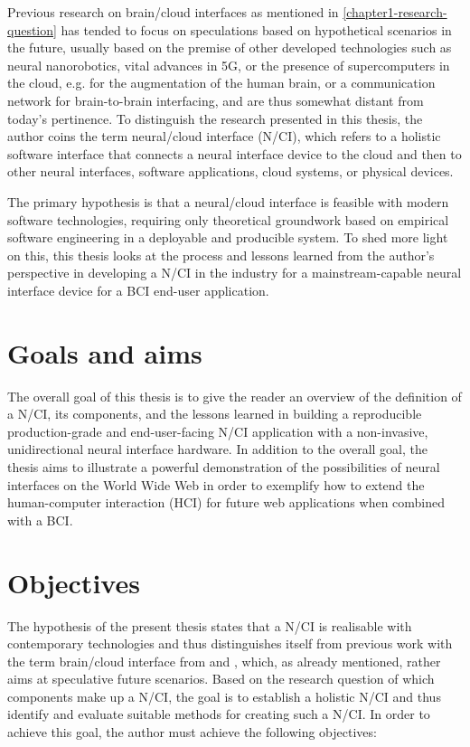 Previous research on brain/cloud interfaces as mentioned in \autoref{chapter1-research-question}  has tended to focus on speculations based on hypothetical scenarios in the future, usually based on the premise of other developed technologies such as neural nanorobotics, vital advances in 5G, or the presence of supercomputers in the cloud, e.g. for the augmentation of the human brain, or a communication network for brain-to-brain interfacing, and are thus somewhat distant from today's pertinence. To distinguish the research presented in this thesis, the author coins the term neural/cloud interface (N/CI), which refers to a holistic software interface that connects a neural interface device to the cloud and then to other neural interfaces, software applications, cloud systems, or physical devices.

The primary hypothesis is that a neural/cloud interface is feasible with modern software technologies, requiring only theoretical groundwork based on empirical software engineering in a deployable and producible system. To shed more light on this, this thesis looks at the process and lessons learned from the author's perspective in developing a N/CI in the industry for a mainstream-capable neural interface device for a BCI end-user application.

\section{Goals and aims}
\label{chapter1-goals-and-aims}

The overall goal of this thesis is to give the reader an overview of the definition of a N/CI, its components, and the lessons learned in building a reproducible production-grade and end-user-facing N/CI application with a non-invasive, unidirectional neural interface hardware. In addition to the overall goal, the thesis aims to illustrate a powerful demonstration of the possibilities of neural interfaces on the World Wide Web in order to exemplify how to extend the human-computer interaction (HCI) for future web applications when combined with a BCI.

\section{Objectives}
\label{chapter1-objectives}

The hypothesis of the present thesis states that a N/CI is realisable with contemporary technologies and thus distinguishes itself from previous work with the term brain/cloud interface from \citeauthor{martins_human_2019} and \citeauthor{angelica_cognitive_2021}, which, as already mentioned, rather aims at speculative future scenarios. Based on the research question of which components make up a N/CI, the goal is to establish a holistic N/CI and thus identify and evaluate suitable methods for creating such a N/CI. In order to achieve this goal, the author must achieve the following objectives:

